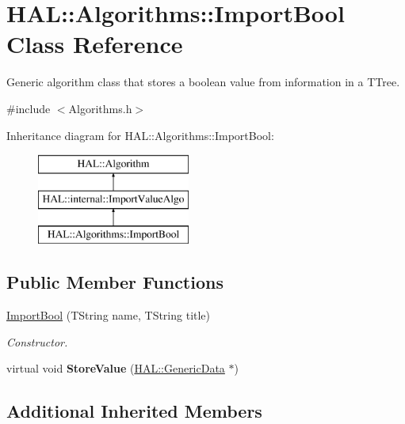 \hypertarget{class_h_a_l_1_1_algorithms_1_1_import_bool}{\section{H\-A\-L\-:\-:Algorithms\-:\-:Import\-Bool Class Reference}
\label{class_h_a_l_1_1_algorithms_1_1_import_bool}
}


Generic algorithm class that stores a boolean value from information in a T\-Tree.  




{\ttfamily \#include $<$Algorithms.\-h$>$}

Inheritance diagram for H\-A\-L\-:\-:Algorithms\-:\-:Import\-Bool\-:\begin{figure}[H]
\begin{center}
\leavevmode
\includegraphics[height=3.000000cm]{class_h_a_l_1_1_algorithms_1_1_import_bool}
\end{center}
\end{figure}
\subsection*{Public Member Functions}
\begin{DoxyCompactItemize}
\item 
\hyperlink{class_h_a_l_1_1_algorithms_1_1_import_bool_a060a260af56afe85c10ff992a0a8b3fa}{Import\-Bool} (T\-String name, T\-String title)
\begin{DoxyCompactList}\small\item\em Constructor. \end{DoxyCompactList}\item 
\hypertarget{class_h_a_l_1_1_algorithms_1_1_import_bool_a5cb75ed42fe19b3c406d8defbf8aaa4f}{virtual void {\bfseries Store\-Value} (\hyperlink{class_h_a_l_1_1_generic_data}{H\-A\-L\-::\-Generic\-Data} $\ast$)}\label{class_h_a_l_1_1_algorithms_1_1_import_bool_a5cb75ed42fe19b3c406d8defbf8aaa4f}

\end{DoxyCompactItemize}
\subsection*{Additional Inherited Members}


